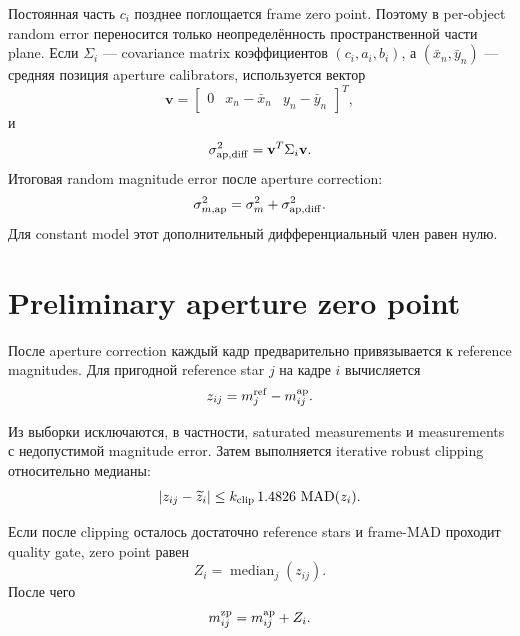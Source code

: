Постоянная часть $c_i$ позднее поглощается frame zero point. Поэтому в per-object random error переносится только неопределённость пространственной части plane. Если $\Sigma_i$ --- covariance matrix коэффициентов $(c_i,a_i,b_i)$, а $(\bar x_n,\bar y_n)$ --- средняя позиция aperture calibrators, используется вектор
\begin{equation}
  \mathbf v=
  \begin{bmatrix}
  0 & x_n-\bar x_n & y_n-\bar y_n
  \end{bmatrix}^{\!T},
\end{equation}
и
\begin{equation}
  \sigma^2_{\rm ap,diff}=\mathbf v^T\Sigma_i\mathbf v.
\end{equation}
Итоговая random magnitude error после aperture correction:
\begin{equation}
  \sigma^2_{m,\rm ap}
  =\sigma_m^2+\sigma^2_{\rm ap,diff}.
\end{equation}
Для constant model этот дополнительный дифференциальный член равен нулю.

\section{Preliminary aperture zero point}
\label{sec:aperture-zp-math}

После aperture correction каждый кадр предварительно привязывается к reference magnitudes. Для пригодной reference star $j$ на кадре $i$ вычисляется
\begin{equation}
  z_{ij}=m^{\rm ref}_j-m^{\rm ap}_{ij}.
  \label{eq:zp-candidate}
\end{equation}

Из выборки исключаются, в частности, saturated measurements и measurements с недопустимой magnitude error. Затем выполняется iterative robust clipping относительно медианы:
\begin{equation}
  |z_{ij}-\widetilde z_i|
  \le k_{\rm clip}\,1.4826\,\operatorname{MAD}(z_i).
\end{equation}

Если после clipping осталось достаточно reference stars и frame-MAD проходит quality gate, zero point равен
\begin{equation}
  Z_i=\operatorname{median}_{j}(z_{ij}).
  \label{eq:frame-zp}
\end{equation}
После чего
\begin{equation}
  m^{\rm zp}_{ij}=m^{\rm ap}_{ij}+Z_i.
  \label{eq:zp-apply}
\end{equation}

